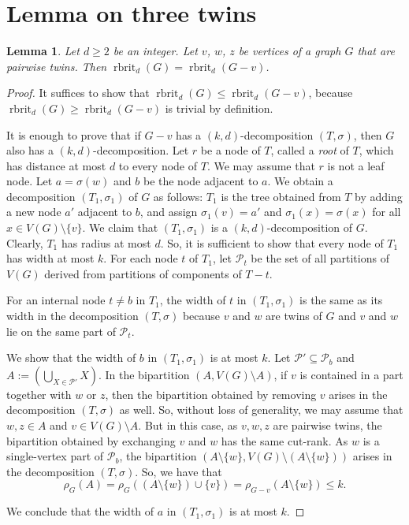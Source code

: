 \documentclass[11pt]{article}
\newtheorem{lemma}[theorem]{Lemma}
\newcommand\rbrit{\operatorname{rbrit}}
\begin{document}
%
%
%
%
%
%
%
%
%
%
%
%
%
%
%
%
%
%
%
%
%
%
%
%
%
%
%
%
%
%
%
%
%
%
%
%
%
%
%
%
%
%
%
%
%
%
%
%
%
%
%
%
%
%
%
%
%
%




	\section{Lemma on three twins}\label{sec:rank1pair}

	\begin{lemma}\label{lem:reducetwin}
	Let $d\ge 2$ be an integer. 
        Let $v$, $w$, $z$ be vertices of a graph $G$ that are pairwise twins. 
	Then $\rbrit_d(G)=\rbrit_d(G-v)$.
	\end{lemma}
	\begin{proof}
          It suffices to show that $\rbrit_d(G)\le \rbrit_d(G-v)$, because $\rbrit_d(G)\ge \rbrit_d(G-v)$ is trivial by definition.

          It is enough to prove that
          if $G-v$ has a $(k,d)$-decomposition $(T,\sigma)$,
          then $G$ also has a $(k,d)$-decomposition.
%
          Let $r$ be a node of $T$, called a \emph{root} of $T$,
          which has distance at most $d$ to every node of $T$.
%
%
%
%
	We may assume that 
	$r$ is not a leaf node.
	Let $a=\sigma(w)$ and $b$ be the node adjacent to $a$.
	We obtain a decomposition $(T_1, \sigma_1)$ of $G$ as follows:
	$T_1$ is the tree obtained from $T$ by adding a new node $a'$ adjacent to $b$, 
	and assign $\sigma_1(v)=a'$ and $\sigma_1(x)=\sigma(x)$ for all $x\in V(G)\setminus \{v\}$.
	We claim that $(T_1, \sigma_1)$ is a $(k, d)$-decomposition of $G$.
	Clearly, $T_1$ has radius at most $d$. So, it is sufficient to show that every node of $T_1$ has width at most $k$.
	For each node $t$ of $T_1$, let $\mathcal{P}_t$ be the set of all partitions of $V(G)$ derived from partitions of components of $T-t$.

		For an internal node $t\neq b$ in $T_1$, the width of $t$ in $(T_1, \sigma_1)$ is the same as its width in the decomposition $(T, \sigma)$
		because $v$ and $w$ are twins of $G$ and $v$ and $w$ lie on the same part of $\mathcal{P}_t$.
		
		We show that the width of $b$ in $(T_1, \sigma_1)$ is at most $k$.
		Let $\mathcal{P'}\subseteq \mathcal{P}_b$ and $A:=\left( \bigcup_{X \in \mathcal{P'} } X \right)$.
		In the bipartition 
		$(A, V(G)\setminus A)$, if $v$ is contained in a part together with $w$ or $z$, 
		then the bipartition obtained by removing $v$  arises in the decomposition $(T, \sigma)$ as well.
		So, without loss of generality, we may assume that $w,z\in A$ and $v\in V(G)\setminus A$.
		But in this case, as $v,w,z$ are pairwise twins, 
		the bipartition obtained by exchanging $v$ and $w$ has the same cut-rank.
		As $w$ is a single-vertex part of $\mathcal{P}_b$,
		the bipartition $(A\setminus \{w\}, V(G)\setminus (A\setminus \{w\}))$ arises in the decomposition $(T, \sigma)$. 
		So, we have that 
		\[\rho_G(A)=\rho_G((A\setminus \{w\})\cup \{v\})=\rho_{G-v}(A\setminus \{w\})\le k.\]

		We conclude that the width of $a$ in $(T_1, \sigma_1)$ is at most $k$.
\end{proof}
	
\end{document}
